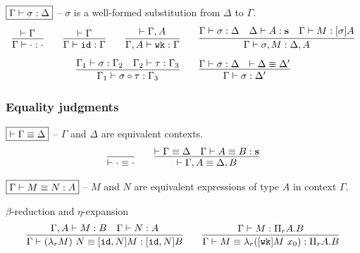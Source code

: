 \noindent
$\boxed{\Gamma \vdash \sigma : \Delta}$ -- $\sigma$ is a well-formed substitution from $\Delta$ to $\Gamma$.
\[
\begin{array}{c}
  \infer{
    \wfsub \Gamma \subempty \ctxempty
  }{
    \wfctx \Gamma
  }
  \qquad
  \infer{
    \wfsub \Gamma \subid \Gamma
  }{
    \wfctx \Gamma
  }
  \qquad
  \infer{
    \wfsub {\ctxext \Gamma A} \subwk \Gamma
  }{
    \wfctx {\ctxext \Gamma A}
  }
  \qquad
  \infer{
    \wfsub \Gamma {\subext \sigma M} {\ctxext \Delta A}
  }{
    \wfsub \Gamma \sigma \Delta
    &
    \wfexp \Delta A {\tmcst s}
    &
    \wfexp \Gamma M {\tmclo \sigma A}
  }
  \\[8pt]
  \infer{
    \wfsub {\Gamma_1} {\subclo \sigma \tau} {\Gamma_3}
  }{
    \wfsub {\Gamma_1} \sigma {\Gamma_2}
    &
    \wfsub {\Gamma_2} \tau {\Gamma_3}
  }
  \qquad
  \infer{
    \wfsub \Gamma \sigma {\Delta'}
  }{
    \wfsub \Gamma \sigma \Delta
    &
    \eqctx \Delta {\Delta'}
  }
\end{array}
\]

\subsubsection{Equality judgments}

\noindent
$\boxed{\vdash \Gamma \equiv \Delta}$ -- $\Gamma$ and $\Delta$ are equivalent contexts.
\[
\begin{array}{c}
  \infer{
    \eqctx \cdot \cdot
  }{
  }
  \qquad
  \infer{
    \eqctx {\ctxext \Gamma A} {\ctxext \Delta B}
  }{
    \eqctx \Gamma \Delta
    &
    \eqexp \Gamma A B {\tmcst s}
  }
\end{array}
\]



\noindent
$\boxed{\Gamma \vdash M \equiv N : A}$ -- $M$ and $N$ are equivalent expressions of type $A$ in context $\Gamma$.

\noindent
$\beta$-reduction and $\eta$-expansion
\[
\begin{array}{c}
  \infer{
    \eqexp \Gamma {\tmapp {(\tmlam M)} N} {\tmclo {\subext \subid N} M} {\tmclo {\subext \subid N} B}
  }{
    \wfexp {\ctxext \Gamma A} M B
    &
    \wfexp \Gamma N A
  }
  \qquad
  \infer{
    \eqexp \Gamma M {\tmlam {(\tmapp {\tmclo \subwk M} {x_0})}} {\tppi A B}
  }{
    \wfexp \Gamma M {\tppi A B}
  }
\end{array}
\]

